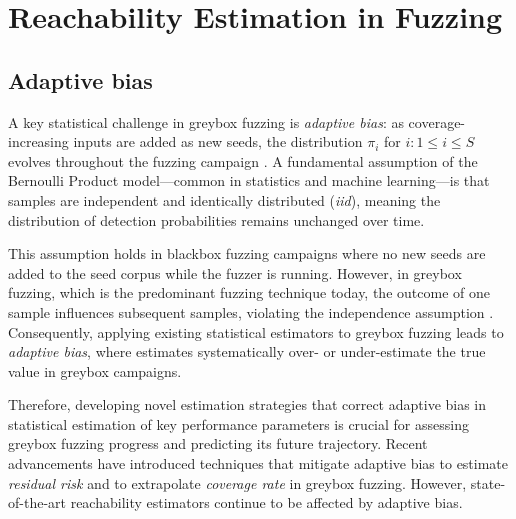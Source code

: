 \documentclass[conference]{IEEEtran}
\begin{document}
\section{Reachability Estimation in Fuzzing}
\label{sec:reachability}


\subsection{Adaptive bias}
A key statistical challenge in greybox fuzzing is \emph{adaptive bias}: as coverage-increasing inputs are added as new seeds, the distribution $\pi_i$ for $i: 1 \leq i \leq S$ evolves throughout the fuzzing campaign \cite{doctoral_2021}. A fundamental assumption of the Bernoulli Product model—common in statistics and machine learning—is that samples are independent and identically distributed (\emph{iid}), meaning the distribution of detection probabilities remains unchanged over time.  

This assumption holds in blackbox fuzzing campaigns where no new seeds are added to the seed corpus while the fuzzer is running. However, in greybox fuzzing, which is the predominant fuzzing technique today, the outcome of one sample influences subsequent samples, violating the independence assumption \cite{entropic,stads,doctoral_2021}. Consequently, applying existing statistical estimators to greybox fuzzing leads to \emph{adaptive bias}, where estimates systematically over- or under-estimate the true value in greybox campaigns.

Therefore, developing novel estimation strategies that correct adaptive bias in statistical estimation of key performance parameters is crucial for assessing greybox fuzzing progress and predicting its future trajectory. Recent advancements have introduced techniques that mitigate adaptive bias to estimate \emph{residual risk} \cite{residual2021} and to extrapolate \emph{coverage rate} \cite{coveragerate2024} in greybox fuzzing. However, state-of-the-art reachability estimators continue to be affected by adaptive bias.
\end{document}
